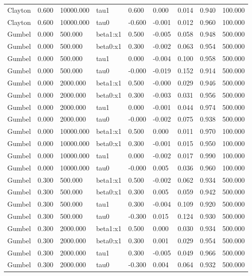 \begin{table}[htbp]
\begin{tabular}{lllllllll}
Clayton & 0.600 & 10000.000 & tau1 & 0.600 & 0.000 & 0.014 & 0.940 & 100.000 \\
Clayton & 0.600 & 10000.000 & tau0 & -0.600 & -0.001 & 0.012 & 0.960 & 100.000 \\
Gumbel & 0.000 & 500.000 & beta1:x1 & 0.500 & -0.005 & 0.058 & 0.948 & 500.000 \\
Gumbel & 0.000 & 500.000 & beta0:x1 & 0.300 & -0.002 & 0.063 & 0.954 & 500.000 \\
Gumbel & 0.000 & 500.000 & tau1 & 0.000 & -0.004 & 0.100 & 0.958 & 500.000 \\
Gumbel & 0.000 & 500.000 & tau0 & -0.000 & -0.019 & 0.152 & 0.914 & 500.000 \\
Gumbel & 0.000 & 2000.000 & beta1:x1 & 0.500 & -0.000 & 0.029 & 0.946 & 500.000 \\
Gumbel & 0.000 & 2000.000 & beta0:x1 & 0.300 & -0.003 & 0.031 & 0.956 & 500.000 \\
Gumbel & 0.000 & 2000.000 & tau1 & 0.000 & -0.001 & 0.044 & 0.974 & 500.000 \\
Gumbel & 0.000 & 2000.000 & tau0 & -0.000 & -0.002 & 0.075 & 0.938 & 500.000 \\
Gumbel & 0.000 & 10000.000 & beta1:x1 & 0.500 & 0.000 & 0.011 & 0.970 & 100.000 \\
Gumbel & 0.000 & 10000.000 & beta0:x1 & 0.300 & -0.001 & 0.015 & 0.950 & 100.000 \\
Gumbel & 0.000 & 10000.000 & tau1 & 0.000 & -0.002 & 0.017 & 0.990 & 100.000 \\
Gumbel & 0.000 & 10000.000 & tau0 & -0.000 & 0.005 & 0.036 & 0.960 & 100.000 \\
Gumbel & 0.300 & 500.000 & beta1:x1 & 0.500 & -0.002 & 0.062 & 0.934 & 500.000 \\
Gumbel & 0.300 & 500.000 & beta0:x1 & 0.300 & 0.005 & 0.059 & 0.942 & 500.000 \\
Gumbel & 0.300 & 500.000 & tau1 & 0.300 & -0.004 & 0.109 & 0.920 & 500.000 \\
Gumbel & 0.300 & 500.000 & tau0 & -0.300 & 0.015 & 0.124 & 0.930 & 500.000 \\
Gumbel & 0.300 & 2000.000 & beta1:x1 & 0.500 & 0.000 & 0.030 & 0.934 & 500.000 \\
Gumbel & 0.300 & 2000.000 & beta0:x1 & 0.300 & 0.001 & 0.029 & 0.954 & 500.000 \\
Gumbel & 0.300 & 2000.000 & tau1 & 0.300 & -0.005 & 0.049 & 0.966 & 500.000 \\
Gumbel & 0.300 & 2000.000 & tau0 & -0.300 & 0.004 & 0.064 & 0.932 & 500.000 \\

\end{tabular}
\end{table}

